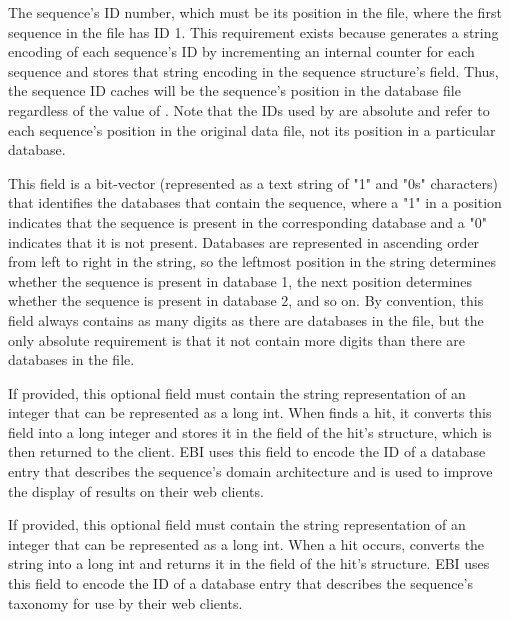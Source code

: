 \documentclass[notoc,justified]{tufte-book}    %
\begin{document}
\begin{sreitems}{}

\item [\monob{seq\_id}] The sequence's ID number, which must be its position in the file, where the first sequence in the file has ID 1. This requirement exists because  generates a string encoding of each sequence's ID by incrementing an internal counter for each sequence and stores that string encoding in the sequence structure's  field.  Thus, the sequence ID  caches will be the sequence's position in the database file regardless of the value of .  Note that the IDs used by  are absolute and refer to each sequence's position in the original data file, not its position in a particular database.

\item [\monob{database\_membership}] This field is a bit-vector (represented as a text string of "1" and "0s" characters) that identifies the databases that contain the sequence, where a "1" in a position indicates that the sequence is present in the corresponding database and a "0" indicates that it is not present.  Databases are represented in ascending order from left to right in the string, so the leftmost position in the string determines whether the sequence is present in database 1, the next position determines whether the sequence is present in database 2, and so on.  By convention, this field always contains as many digits as there are databases in the file, but the only absolute requirement is that it not contain more digits than there are databases in the file.

\item [\monob{domain\_architecture}] If provided, this optional field must contain the string representation of an integer that can be represented as a long int.  When  finds a hit, it converts this field into a long integer and stores it in the  field of the hit's  structure, which is then returned to the client.  EBI uses this field to encode the ID of a database entry that describes the sequence's domain architecture and is used to improve the display of results on their web clients.   

\item [\monob{taxonomy\_id}] If provided, this optional field must contain the string representation of an integer that can be represented as a long int.  When a hit occurs,  converts the string into a long int and returns it in the  field of the hit's  structure.  EBI uses this field to encode the ID of a database entry that describes the sequence's taxonomy for use by their web clients.

\end{sreitems}
\end{document}
